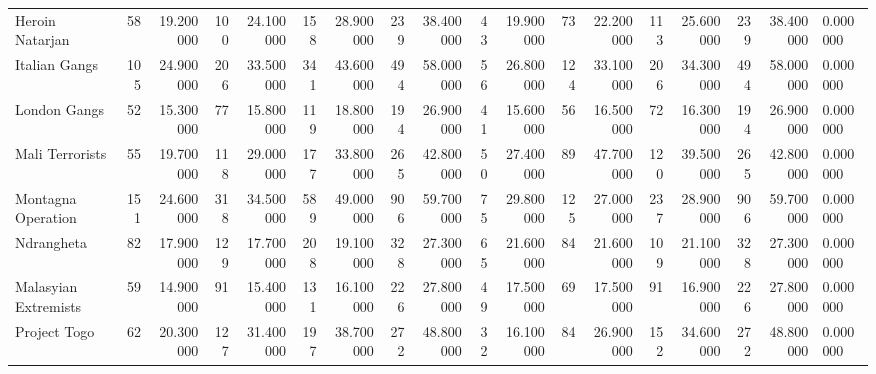 \begin{tabular}{lrrrrrrrrrrrrrrrrl}
Heroin Natarjan & 58 & 19.200000 & 100 & 24.100000 & 158 & 28.900000 & 239 & 38.400000 & 43 & 19.900000 & 73 & 22.200000 & 113 & 25.600000 & 239 & 38.400000 & 0.000000 \\
Italian Gangs & 105 & 24.900000 & 206 & 33.500000 & 341 & 43.600000 & 494 & 58.000000 & 56 & 26.800000 & 124 & 33.100000 & 206 & 34.300000 & 494 & 58.000000 & 0.000000 \\
London Gangs & 52 & 15.300000 & 77 & 15.800000 & 119 & 18.800000 & 194 & 26.900000 & 41 & 15.600000 & 56 & 16.500000 & 72 & 16.300000 & 194 & 26.900000 & 0.000000 \\
Mali Terrorists & 55 & 19.700000 & 118 & 29.000000 & 177 & 33.800000 & 265 & 42.800000 & 50 & 27.400000 & 89 & 47.700000 & 120 & 39.500000 & 265 & 42.800000 & 0.000000 \\
Montagna Operation & 151 & 24.600000 & 318 & 34.500000 & 589 & 49.000000 & 906 & 59.700000 & 75 & 29.800000 & 125 & 27.000000 & 237 & 28.900000 & 906 & 59.700000 & 0.000000 \\
Ndrangheta & 82 & 17.900000 & 129 & 17.700000 & 208 & 19.100000 & 328 & 27.300000 & 65 & 21.600000 & 84 & 21.600000 & 109 & 21.100000 & 328 & 27.300000 & 0.000000 \\
Malasyian Extremists & 59 & 14.900000 & 91 & 15.400000 & 131 & 16.100000 & 226 & 27.800000 & 49 & 17.500000 & 69 & 17.500000 & 91 & 16.900000 & 226 & 27.800000 & 0.000000 \\
Project Togo & 62 & 20.300000 & 127 & 31.400000 & 197 & 38.700000 & 272 & 48.800000 & 32 & 16.100000 & 84 & 26.900000 & 152 & 34.600000 & 272 & 48.800000 & 0.000000 \\
\end{tabular}
